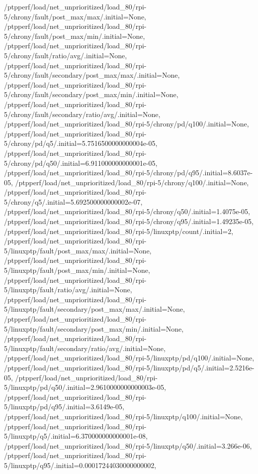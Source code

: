 {    /ptpperf/load/net_unprioritized/load_80/rpi-5/chrony/fault/post_max/max/.initial=None,
    /ptpperf/load/net_unprioritized/load_80/rpi-5/chrony/fault/post_max/min/.initial=None,
    /ptpperf/load/net_unprioritized/load_80/rpi-5/chrony/fault/ratio/avg/.initial=None,
    /ptpperf/load/net_unprioritized/load_80/rpi-5/chrony/fault/secondary/post_max/max/.initial=None,
    /ptpperf/load/net_unprioritized/load_80/rpi-5/chrony/fault/secondary/post_max/min/.initial=None,
    /ptpperf/load/net_unprioritized/load_80/rpi-5/chrony/fault/secondary/ratio/avg/.initial=None,
    /ptpperf/load/net_unprioritized/load_80/rpi-5/chrony/pd/q100/.initial=None,
    /ptpperf/load/net_unprioritized/load_80/rpi-5/chrony/pd/q5/.initial=5.7516500000000004e-05,
    /ptpperf/load/net_unprioritized/load_80/rpi-5/chrony/pd/q50/.initial=6.911000000000001e-05,
    /ptpperf/load/net_unprioritized/load_80/rpi-5/chrony/pd/q95/.initial=8.6037e-05,
    /ptpperf/load/net_unprioritized/load_80/rpi-5/chrony/q100/.initial=None,
    /ptpperf/load/net_unprioritized/load_80/rpi-5/chrony/q5/.initial=5.692500000000002e-07,
    /ptpperf/load/net_unprioritized/load_80/rpi-5/chrony/q50/.initial=1.4075e-05,
    /ptpperf/load/net_unprioritized/load_80/rpi-5/chrony/q95/.initial=1.49235e-05,
    /ptpperf/load/net_unprioritized/load_80/rpi-5/linuxptp/count/.initial=2,
    /ptpperf/load/net_unprioritized/load_80/rpi-5/linuxptp/fault/post_max/max/.initial=None,
    /ptpperf/load/net_unprioritized/load_80/rpi-5/linuxptp/fault/post_max/min/.initial=None,
    /ptpperf/load/net_unprioritized/load_80/rpi-5/linuxptp/fault/ratio/avg/.initial=None,
    /ptpperf/load/net_unprioritized/load_80/rpi-5/linuxptp/fault/secondary/post_max/max/.initial=None,
    /ptpperf/load/net_unprioritized/load_80/rpi-5/linuxptp/fault/secondary/post_max/min/.initial=None,
    /ptpperf/load/net_unprioritized/load_80/rpi-5/linuxptp/fault/secondary/ratio/avg/.initial=None,
    /ptpperf/load/net_unprioritized/load_80/rpi-5/linuxptp/pd/q100/.initial=None,
    /ptpperf/load/net_unprioritized/load_80/rpi-5/linuxptp/pd/q5/.initial=2.5216e-05,
    /ptpperf/load/net_unprioritized/load_80/rpi-5/linuxptp/pd/q50/.initial=2.9610000000000003e-05,
    /ptpperf/load/net_unprioritized/load_80/rpi-5/linuxptp/pd/q95/.initial=3.6149e-05,
    /ptpperf/load/net_unprioritized/load_80/rpi-5/linuxptp/q100/.initial=None,
    /ptpperf/load/net_unprioritized/load_80/rpi-5/linuxptp/q5/.initial=6.370000000000001e-08,
    /ptpperf/load/net_unprioritized/load_80/rpi-5/linuxptp/q50/.initial=3.266e-06,
    /ptpperf/load/net_unprioritized/load_80/rpi-5/linuxptp/q95/.initial=0.00017244030000000002,
}
